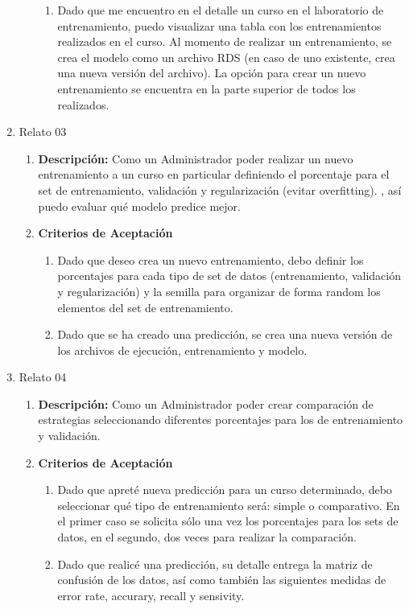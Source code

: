 \begin{enumerate}
\begin{enumerate}
\begin{enumerate}
					\item Dado que me encuentro en el detalle un curso en el laboratorio de entrenamiento, puedo visualizar una tabla con los entrenamientos realizados en el curso. Al momento de realizar un entrenamiento, se crea el modelo como un archivo RDS (en caso de uno existente, crea una nueva versión del archivo). La opción para crear un nuevo entrenamiento se encuentra en la parte superior de todos los realizados.
				\end{enumerate}
		\end{enumerate}
	\item Relato 03
		\begin{enumerate}
			\item \textbf{Descripción:} Como un Administrador poder realizar un nuevo entrenamiento a un curso en particular definiendo el porcentaje para el set de entrenamiento, validación y regularización (evitar overfitting). , así puedo evaluar qué modelo predice mejor.
			\item \textbf{Criterios de Aceptación}
				\begin{enumerate}
					\item Dado que deseo crea un nuevo entrenamiento, debo definir los porcentajes para cada tipo de set de datos (entrenamiento, validación y regularización) y la semilla para organizar de forma random los elementos del set de entrenamiento.
					\item Dado que se ha creado una predicción, se crea una nueva versión de los archivos de ejecución, entrenamiento y modelo.
				\end{enumerate}
		\end{enumerate}
	\item Relato 04
		\begin{enumerate}
			\item \textbf{Descripción:} Como un Administrador poder crear comparación de estrategias seleccionando diferentes porcentajes para los de entrenamiento y validación.
			\item \textbf{Criterios de Aceptación}
				\begin{enumerate}
					\item Dado que apreté nueva predicción para un curso determinado, debo seleccionar qué tipo de entrenamiento será: simple o comparativo. En el primer caso se solicita sólo una vez los porcentajes para los sets de datos, en el segundo, dos veces para realizar la comparación.
					\item Dado que realicé una predicción, su detalle entrega la matriz de confusión de los datos, así como también las siguientes medidas de error rate, accurary, recall y sensivity.
				\end{enumerate}
		\end{enumerate}
\end{enumerate}

